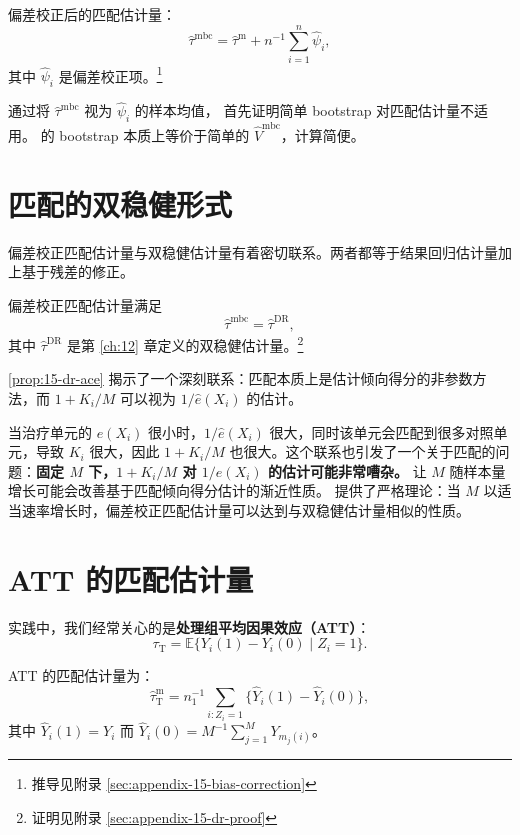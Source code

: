 偏差校正后的匹配估计量：
\[
\hat\tau^{\mathrm{mbc}} = \hat\tau^{\mathrm{m}} + n^{-1} \sum_{i=1}^{n} \hat\psi_i ,
\label{eq:15-bias-corrected}
\]
其中 $\hat\psi_i$ 是偏差校正项。\footnote{推导见附录 \cref{sec:appendix-15-bias-correction}}

通过将 $\hat\tau^{\mathrm{mbc}}$ 视为 $\hat\psi_i$ 的样本均值，\citet{AbadieImbens:2008} 首先证明简单 bootstrap 对匹配估计量不适用。\citet{OtsuRai:2017} 的 bootstrap 本质上等价于简单的 $\hat V^{\mathrm{mbc}}$，计算简便。

\section{匹配的双稳健形式}\label{sec:15-dr-form}

偏差校正匹配估计量与双稳健估计量有着密切联系。两者都等于结果回归估计量加上基于残差的修正。

\begin{Proposition}\label{prop:15-dr-ace}
偏差校正匹配估计量满足
\[
\hat\tau^{\mathrm{mbc}} = \hat\tau^{\mathrm{DR}},
\]
其中 $\hat\tau^{\mathrm{DR}}$ 是第 \ref{ch:12} 章定义的双稳健估计量。\footnote{证明见附录 \cref{sec:appendix-15-dr-proof}}
\end{Proposition}

\cref{prop:15-dr-ace} 揭示了一个深刻联系：匹配本质上是估计倾向得分的非参数方法，而 $1 + K_i / M$ 可以视为 $1 / \hat e(X_i)$ 的估计。

当治疗单元的 $e(X_i)$ 很小时，$1 / \hat e(X_i)$ 很大，同时该单元会匹配到很多对照单元，导致 $K_i$ 很大，因此 $1 + K_i / M$ 也很大。这个联系也引发了一个关于匹配的问题：\textbf{固定 $M$ 下，$1 + K_i / M$ 对 $1 / e(X_i)$ 的估计可能非常嘈杂。} 让 $M$ 随样本量增长可能会改善基于匹配倾向得分估计的渐近性质。\citet{LinEtAl:2023} 提供了严格理论：当 $M$ 以适当速率增长时，偏差校正匹配估计量可以达到与双稳健估计量相似的性质。

\section{ATT 的匹配估计量}\label{sec:15-att-estimator}

实践中，我们经常关心的是\textbf{处理组平均因果效应（ATT）}：
\[
\tau_{\mathrm{T}} = \mathbb{E}\{Y_i(1) - Y_i(0) \mid Z_i = 1\}.
\]

ATT 的匹配估计量为：
\[
\hat\tau_{\mathrm{T}}^{\mathrm{m}} = n_1^{-1} \sum_{i: Z_i=1} \{\hat Y_i(1) - \hat Y_i(0)\},
\]
其中 $\hat Y_i(1) = Y_i$ 而 $\hat Y_i(0) = M^{-1} \sum_{j=1}^{M} Y_{m_j(i)}$。

